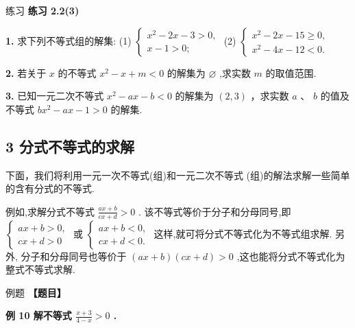 \documentclass[a4paper,10pt,oneside,fontset=none]{ctexbook}
\renewcommand{\geq}{\geqslant}
\newcounter{example}[chapter]
\newenvironment{example}[1][]{\begin{exBox}{例题}{#1}}{\end{exBox}}
\newenvironment{exercise}[1][]{\begin{exBox}{练习}{#1}}{\end{exBox}}
\numberwithin{equation}{chapter}
\begin{document}
\begin{exercise}
\textbf{练习 2.2(3)}\par\vspace{0.5em}
\textbf{1.} 求下列不等式组的解集: (1) $\left\{  \begin{array}{l} {x}^{2} - {2x} - 3 > 0, \\  x - 1 > 0; \end{array}\right.$ (2) $\left\{  \begin{array}{l} {x}^{2} - {2x} - {15} \geq  0, \\  {x}^{2} - {4x} - {12} < 0. \end{array}\right.$
\par\vspace{0.8em}
\textbf{2.} 若关于 $x$ 的不等式 ${x}^{2} - x + m < 0$ 的解集为 $\varnothing$ ,求实数 $m$ 的取值范围.
\par\vspace{0.8em}
\textbf{3.} 已知一元二次不等式 ${x}^{2} - {ax} - b < 0$ 的解集为 $\left( {2,3}\right)$ ，求实数 $a$ 、 $b$ 的值及不等式 $b{x}^{2} - {ax} - 1 > 0$ 的解集.
\end{exercise}

\subsection{3 分式不等式的求解}

下面，我们将利用一元一次不等式(组)和一元二次不等式 (组)的解法求解一些简单的含有分式的不等式.

例如,求解分式不等式 $\frac{{ax} + b}{{cx} + d} > 0$ . 该不等式等价于分子和分母同号,即 $\left\{  \begin{array}{l} {ax} + b > 0, \\  {cx} + d > 0 \end{array}\right.$ 或 $\left\{  \begin{array}{l} {ax} + b < 0, \\  {cx} + d < 0. \end{array}\right.$ 这样,就可将分式不等式化为不等式组求解. 另外, 分子和分母同号也等价于 $\left( {{ax} + b}\right) \left( {{cx} + d}\right)  > 0$ ,这也能将分式不等式化为整式不等式求解.

\begin{example}
\textbf{【题目】}\par\vspace{0.3em}
\textbf{例 10 解不等式 $\frac{x + 3}{4 - x} > 0$ .}\par\vspace{0.3em}
\end{example}
\end{document}
